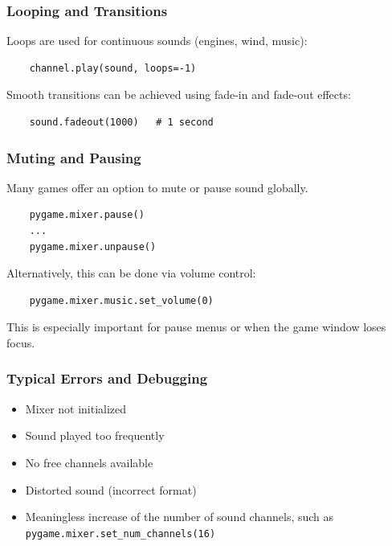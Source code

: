 \subsubsection{Looping and Transitions}

Loops are used for continuous sounds (engines, wind, music): 

\lstset{firstnumber=1}
\begin{lstlisting}
	channel.play(sound, loops=-1)
\end{lstlisting}

Smooth transitions can be achieved using fade-in and fade-out effects:

\lstset{firstnumber=1}
\begin{lstlisting}
	sound.fadeout(1000)   # 1 second
\end{lstlisting}


\subsubsection{Muting and Pausing}

Many games offer an option to mute or pause sound globally.

\lstset{firstnumber=1}
\begin{lstlisting}
	pygame.mixer.pause()
	...
	pygame.mixer.unpause()
\end{lstlisting}


Alternatively, this can be done via volume control:

\lstset{firstnumber=1}
\begin{lstlisting}
	pygame.mixer.music.set_volume(0)
\end{lstlisting}


This is especially important for pause menus or when the game window loses focus.

\subsubsection{Typical Errors and Debugging}

\begin{warningbox}
\begin{itemize}
	\item Mixer not initialized
	\item Sound played too frequently
	\item No free channels available
	\item Distorted sound (incorrect format)
	\item Meaningless increase of the number of sound channels, such as \texttt{pygame\-.mixer\-.set\-\_num\-\_channels(16)}
\end{itemize}
\end{warningbox}



